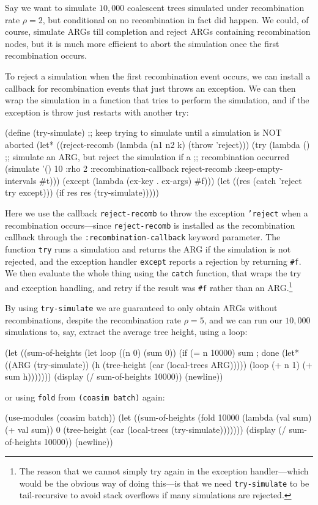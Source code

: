 \documentclass{manual}
\begin{document}
Say we want to simulate $10,000$ coalescent trees simulated under
recombination rate $\rho=2$, but conditional on no recombination in
fact did happen.  We could, of course, simulate ARGs till completion
and reject ARGs containing recombination nodes, but it is much more
efficient to abort the simulation once the first recombination occurs.

To reject a simulation when the first recombination event occurs, we
can install a callback for recombination events that just throws an
exception.  We can then wrap the simulation in a function that tries
to perform the simulation, and if the exception is throw just restarts
with another try:
\begin{code}
(define (try-simulate)
  ;; keep trying to simulate until a simulation is NOT aborted
  (let* ((reject-recomb (lambda (n1 n2 k) (throw 'reject)))
         (try (lambda ()
                ;; simulate an ARG, but reject the simulation if a
                ;; recombination occurred
                (simulate '() 10 :rho 2
                          :recombination-callback reject-recomb
                          :keep-empty-intervals   #t)))
         (except (lambda (ex-key . ex-args) #f)))
    (let ((res (catch 'reject try except)))
      (if res res (try-simulate)))))
\end{code}
Here we use the callback \texttt{reject-recomb} to throw the exception
\texttt{'reject} when a recombination occurs---since
\texttt{reject-recomb} is installed as the recombination callback
through the \texttt{:recombination-callback} keyword parameter.  The
function \texttt{try} runs a simulation and returns the ARG if the
simulation is not rejected, and the exception handler \texttt{except}
reports a rejection by returning \texttt{\#f}.  We then evaluate the
whole thing using the \texttt{catch} function, that wraps the try and
exception handling, and retry if the result was \texttt{\#f} rather
than an ARG.\footnote{The reason that we cannot simply try again in
  the exception handler---which would be the obvious way of doing
  this---is that we need \texttt{try-simulate} to be tail-recursive to
  avoid stack overflows if many simulations are rejected.}

By using \texttt{try-simulate} we are guaranteed to only obtain ARGs
without recombinations, despite the recombination rate $\rho=5$, and
we can run our $10,000$ simulations to, say, extract the average tree
height, using a loop:
\begin{code}
(let ((sum-of-heights
       (let loop ((n 0) (sum 0))
         (if (= n 10000) sum ; done
             (let* ((ARG (try-simulate))
                    (h   (tree-height (car (local-trees ARG)))))
               (loop (+ n 1) (+ sum h)))))))
  (display (/ sum-of-heights 10000))
  (newline))
\end{code}
or using \texttt{fold} from \texttt{(coasim batch)} again:
\begin{code}
(use-modules (coasim batch))
(let ((sum-of-heights
       (fold 10000 (lambda (val sum) (+ val sum)) 0
             (tree-height (car (local-trees (try-simulate)))))))
  (display (/ sum-of-heights 10000))
  (newline))
\end{code}
\end{document}
